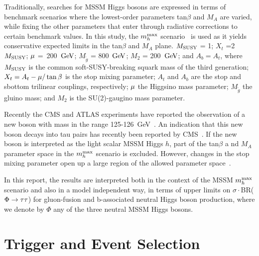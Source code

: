 Traditionally, searches for MSSM Higgs bosons are expressed in terms of benchmark scenarios where 
the lowest-order parameters tan$\beta$ and $M_A$ are varied, while fixing the other parameters that 
enter through radiative corrections to certain benchmark values. 
In this study, the $m_{h}^{\rm max}$ scenario~\cite{MHMAX-Carena,MHMAX-Carena-2002} is used as it 
yields conservative expected limits in the tan$\beta$ and $M_A$ plane. 
$M_{\rm SUSY}$ = 1\TeV; $X_t$ =2$M_{\rm SUSY}$; $\mathrm{\mu}$ =~200~$\mathrm{GeV}$; $M_{\tilde{g}}$ = 800~$\mathrm{GeV}$; 
$M_2$ = 200~$\mathrm{GeV}$; and $A_b = A_t$, where $M_{\rm SUSY}$ is the common soft-SUSY-breaking squark 
mass of the third generation; $X_t = A_t - \mathrm{\mu}/\tan\beta$ is the stop mixing parameter; $A_t$ 
and $A_b$ are the stop and sbottom trilinear couplings, respectively; $\mathrm{\mu}$ the Higgsino mass 
parameter; $M_{\tilde{g}}$ the gluino mass; and $M_2$ is the SU(2)-gaugino mass parameter. 

Recently the CMS and ATLAS experiments have reported the observation of a new boson with mass 
in the range 125-126~GeV~\cite{CMS-HIGGS-DISCOVERY,ATLAS-HIGGS-DISCOVERY}. 
An indication that this new boson decays into tau pairs has recently been reported by 
CMS~\cite{CMS-PAPER-HIG-13-004}.
If the new boson is interpreted as the light scalar MSSM Higgs $h$, part of the tan$\beta$ a
nd $M_A$ parameter space in the $m_{h}^{\rm max}$ scenario is excluded. 
However, changes in the stop mixing parameter open up a large region of the allowed parameter 
space~\cite{Heinemeyer:2011aa,Carena:2013qia}. 

In this report, the results are interpreted both in the context of the MSSM $m_{h}^{\rm max}$ scenario and also in a model independent way, 
in terms of upper limits on $\sigma\cdot$BR($\Phi\to\mathrm{\tau}\mathrm{\tau}$) for gluon-fusion and b-associated neutral Higgs boson production,
where we denote by $\Phi$ any of the three neutral MSSM Higgs bosons.




 

\section{Trigger and Event Selection}


